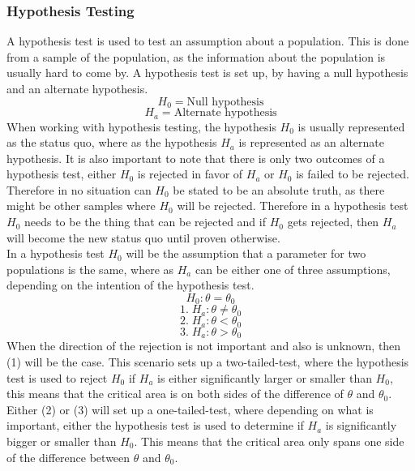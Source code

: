 \subsubsection{Hypothesis Testing}
A hypothesis test is used to test an assumption about a population. This is done from a sample of the population, as the information about the population is usually hard to come by. A hypothesis test is set up, by having a null hypothesis and an alternate hypothesis.
$$H_0 = \text{Null hypothesis}$$
$$H_a = \text{Alternate hypothesis}$$
When working with hypothesis testing, the hypothesis $H_0$ is usually represented as the status quo, where as the hypothesis $H_a$ is represented as an alternate hypothesis. It is also important to note that there is only two outcomes of a hypothesis test, either $H_0$ is rejected in favor of $H_a$ or $H_0$ is failed to be rejected. Therefore in no situation can $H_0$ be stated to be an absolute truth, as there might be other samples where $H_0$ will be rejected. Therefore in a hypothesis test $H_0$ needs to be the thing that can be rejected and if $H_0$ gets rejected, then $H_a$ will become the new status quo until proven otherwise.\\
In a hypothesis test $H_0$ will be the assumption that a parameter for two populations is the same, where as $H_a$ can be either one of three assumptions, depending on the intention of the hypothesis test.
$$H_0: \theta = \theta_0$$
$$1.\;H_a: \theta \neq \theta_0$$
$$2.\;H_a: \theta < \theta_0$$
$$3.\;H_a: \theta > \theta_0$$
When the direction of the rejection is not important and also is unknown, then (1) will be the case. This scenario sets up a two-tailed-test, where the hypothesis test is used to reject $H_0$ if $H_a$ is either significantly larger or smaller than $H_0$, this means that the critical area is on both sides of the difference of $\theta$ and $\theta_0$. Either (2) or (3) will set up a one-tailed-test, where depending on what is important, either the hypothesis test is used to determine if $H_a$ is significantly bigger or smaller than $H_0$. This means that the critical area only spans one side of the difference between $\theta$ and $\theta_0$.\\



